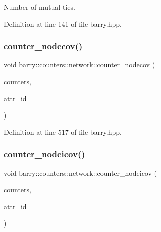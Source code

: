 Number of mutual ties. 



Definition at line 141 of file barry.\+hpp.

\mbox{\label{namespacebarry_1_1counters_1_1network_a7087c6419195bc768c1e8c7730757d2e}} 
\subsubsection{\texorpdfstring{counter\+\_\+nodecov()}{counter\_nodecov()}}
{\footnotesize\ttfamily void barry\+::counters\+::network\+::counter\+\_\+nodecov (\begin{DoxyParamCaption}\item[{\hyperlink{namespacebarry_1_1counters_1_1network_a3b3c590303d47840d1967372ae495d95}{Net\+Counter\+Vector} $\ast$}]{counters,  }\item[{\hyperlink{namespacebarry_a11dfc53ddb4672278319aa04f1e09a6c}{uint}}]{attr\+\_\+id }\end{DoxyParamCaption})\hspace{0.3cm}{\ttfamily [inline]}}



Definition at line 517 of file barry.\+hpp.

\mbox{\label{namespacebarry_1_1counters_1_1network_aef48e4ae85d30c2a949006faee2b5bae}} 
\subsubsection{\texorpdfstring{counter\+\_\+nodeicov()}{counter\_nodeicov()}}
{\footnotesize\ttfamily void barry\+::counters\+::network\+::counter\+\_\+nodeicov (\begin{DoxyParamCaption}\item[{\hyperlink{namespacebarry_1_1counters_1_1network_a3b3c590303d47840d1967372ae495d95}{Net\+Counter\+Vector} $\ast$}]{counters,  }\item[{\hyperlink{namespacebarry_a11dfc53ddb4672278319aa04f1e09a6c}{uint}}]{attr\+\_\+id }\end{DoxyParamCaption})\hspace{0.3cm}{\ttfamily [inline]}}



